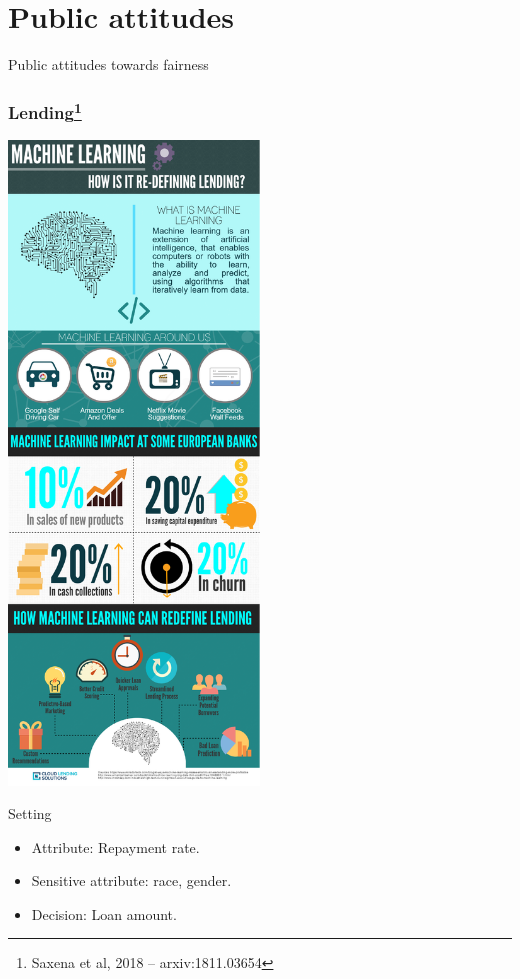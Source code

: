 \section{Public attitudes}
\begin{frame}
  \centering
  {\Huge Public attitudes towards fairness}
\end{frame}
\begin{frame}
  \frametitle{Lending\footnote{Saxena et al, 2018 -- arxiv:1811.03654}}
  \centering
  \includegraphics[width=0.5\textwidth,clip = true, trim=0 0 0 42.5cm]{../figures/lending.pdf}

  \begin{block}{Setting}
    \begin{itemize}
    \item Attribute: Repayment rate.
    \item Sensitive attribute: race, gender.
    \item Decision: Loan amount.
    \end{itemize}
  \end{block}
\end{frame}

